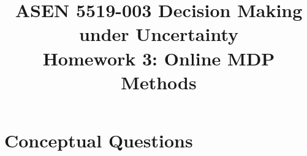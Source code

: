 \documentclass{article}
\title{ASEN 5519-003 Decision Making under Uncertainty\\
       Homework 3: Online MDP Methods}
\theoremstyle{definition}
\newtheorem{question}[thm]{Question}
\begin{document}
\maketitle

\section{Conceptual Questions}


% 

\end{document}
